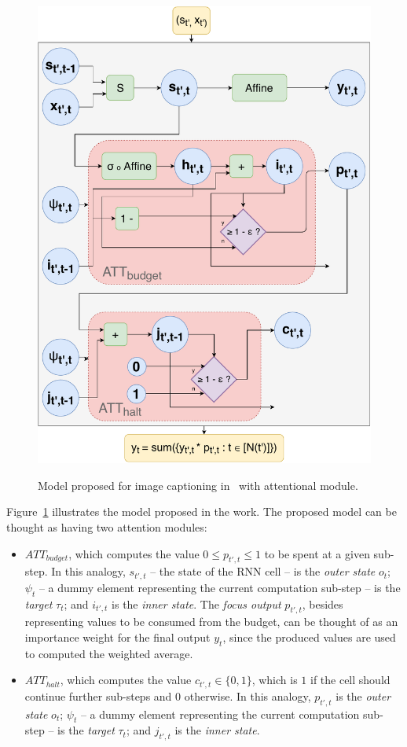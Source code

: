 \documentclass[7pt]{article}
\begin{document}
\begin{figure}[H]
    \centering
    \includegraphics[width=0.6\linewidth]{./img/act.pdf}
    \label{fig:act}
    \caption{Model proposed for image captioning in~\cite{ref:act} with attentional module.}
\end{figure}

Figure~\ref{fig:act} illustrates the model proposed in the work.
The proposed model can be thought as having two attention modules:
\begin{itemize}
    \item \textbf{$ATT_{budget}$}, which computes the value $0 \le p_{t',t} \le 1$ to be spent at a given sub-step.
        In this analogy, $s_{t',t}$ -- the state of the RNN cell -- is the \emph{outer state} $o_t$;
        $\psi_t$ -- a dummy element representing the current computation sub-step -- is the \emph{target} $\tau_t$;
        and $i_{t',t}$ is the \emph{inner state}.
        The \emph{focus output} $p_{t',t}$, besides representing values to be consumed from the budget,
        can be thought of as an importance weight for the final output $y_t$, since the produced values are used to computed
        the weighted average.
    \item \textbf{$ATT_{halt}$}, which computes the value $c_{t',t} \in \{0, 1\}$, which is $1$ if the cell should continue
        further sub-steps and $0$ otherwise.
        In this analogy, $p_{t',t}$ is the \emph{outer state} $o_t$;
        $\psi_t$ -- a dummy element representing the current computation sub-step -- is the \emph{target} $\tau_t$;
        and $j_{t',t}$ is the \emph{inner state}.
\end{itemize}
\end{document}
